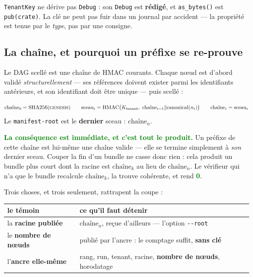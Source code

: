 \documentclass[10pt]{report}
\newcommand{\code}[1]{\texttt{\small #1}}
\newcommand{\ok}[1]{\textcolor{green}{\textbf{#1}}}
\begin{document}
\begin{alerte}
\code{TenantKey} ne dérive pas \code{Debug} : son \code{Debug} est \textbf{rédigé}, et
\code{as\_bytes()} est \code{pub(crate)}. La clé ne peut pas fuir dans un journal par accident ---
la propriété est tenue par le \emph{type}, pas par une consigne.
\end{alerte}

\subsection{La chaîne, et pourquoi un préfixe se re-prouve}

Le DAG scellé est une chaîne de HMAC courants. Chaque nœud est d'abord validé
\emph{structurellement} --- ses références doivent exister parmi les identifiants antérieurs, et son
identifiant doit être unique --- puis scellé :

\begin{these}
\[
\text{chaîne}_0 = \mathrm{SHA256}(\textsc{genesis}) \qquad
\text{sceau}_i = \mathrm{HMAC}\big(K_{\text{tenant}},\ \text{chaîne}_{i-1} \Vert \mathrm{canonical}(n_i)\big) \qquad
\text{chaîne}_i = \text{sceau}_i
\]
\centering Le \code{manifest-root} est le \textbf{dernier} sceau : $\text{chaîne}_n$.
\end{these}

\ok{La conséquence est immédiate, et c'est tout le produit.} Un préfixe de cette chaîne est
lui-même une chaîne valide --- elle se termine simplement à \emph{son} dernier sceau. Couper la fin
d'un bundle ne casse donc rien : cela produit un bundle plus court dont la racine est
$\text{chaîne}_k$ au lieu de $\text{chaîne}_n$. Le vérifieur qui n'a que le bundle recalcule
$\text{chaîne}_k$, la trouve cohérente, et rend \ok{0}.

Trois choses, et trois seulement, rattrapent la coupe :

\begin{longtable}{@{}p{5.4cm} p{9.6cm}@{}}
\toprule \textbf{le témoin} & \textbf{ce qu'il faut détenir} \\ \midrule \endhead
la \textbf{racine publiée} & $\text{chaîne}_n$, reçue d'ailleurs --- l'option \code{-{}-root} \\
le \textbf{nombre de nœuds} & publié par l'ancre : le comptage suffit, \textbf{sans clé} \\
l'\textbf{ancre elle-même} & rang, run, tenant, racine, \textbf{nombre de nœuds}, horodatage \\
\bottomrule
\end{longtable}
\end{document}

